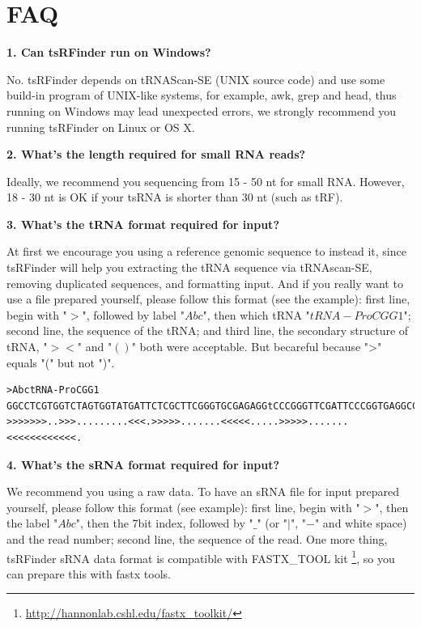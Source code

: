 \documentclass[11pt, a4paper]{article}
\begin{document}
\section{FAQ}

\textbf{1. Can tsRFinder run on Windows?}

No. tsRFinder depends on tRNAScan-SE (UNIX source code) and use some build-in program of UNIX-like systems, for example, awk, grep and head, thus running on Windows may lead unexpected errors, we strongly recommend you running tsRFinder on Linux or OS X.

\textbf{2. What's the length required for small RNA reads?}

Ideally, we recommend you sequencing from 15 - 50 nt for small RNA. However, 18 - 30 nt is OK if your tsRNA is shorter than 30 nt (such as tRF).

\textbf{3. What's the tRNA format required for input?}

At first we encourage you using a reference genomic sequence to instead it, since tsRFinder will help you extracting the tRNA sequence via tRNAscan-SE, removing duplicated sequences, and formatting input. And if you really want to use a file prepared yourself, please follow this format (see the example): first line, begin with "$>$", followed by label "$Abc$", then which tRNA "$tRNA-ProCGG1$";  second line, the sequence of the tRNA; and third line, the secondary structure of tRNA, "$><$" and "$()$" both were acceptable. But becareful because ">" equals "(" but not ")". 

{\tiny \begin{tcolorbox}[colback=blue!5!white,colframe=blue!75!black,title=tRNA example]
\begin{verbatim}
>AbctRNA-ProCGG1
GGCCTCGTGGTCTAGTGGTATGATTCTCGCTTCGGGTGCGAGAGGtCCCGGGTTCGATTCCCGGTGAGGCCC
>>>>>>>..>>>.........<<<.>>>>>.......<<<<<.....>>>>>.......<<<<<<<<<<<<.
\end{verbatim}
\end{tcolorbox}}

\textbf{4. What's the sRNA format required for input?}

We recommend you using a raw data. To have an sRNA file for input prepared yourself, please follow this format (see example): first line, begin with "$>$", then the label "$Abc$", then the 7\-bit index, followed by "$\_$" (or "$|$", "$-$" and white space) and the read number; second line, the sequence of the read. One more thing, tsRFinder sRNA data format is compatible with FASTX\_TOOL kit \footnote{\url{http://hannonlab.cshl.edu/fastx_toolkit/}}, so you can prepare this with fastx tools. 
\end{document}
